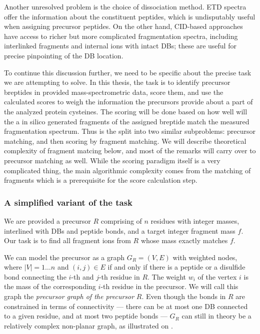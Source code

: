 Another unresolved problem is the choice of dissociation method. ETD spectra offer the information about the constituent peptides, which is undisputably useful when assigning precursor peptides. On the other hand, CID-based approaches have access to richer but more complicated fragmentation spectra, including interlinked fragments and internal ions with intact DBs; these are useful for precise pinpointing of the DB location.

To continue this discussion further, we need to be specific about the precise task we are attempting to solve. In this thesis, the task is to identify precursor breptides in provided mass-spectrometric data, score them, and use the calculated scores to weigh the information the precursors provide about a part of the analyzed protein cysteines. The scoring will be done based on how well will the a in silico generated fragments of the assigned breptide match the measured fragmentation spectrum. Thus is the split into two similar subproblems: precursor matching, and then scoring by fragment matching. We will describe theoretical complexity of fragment matcing below, and most of the remarks will carry over to precursor matching as well. While the scoring paradigm itself is a very complicated thing, the main algorithmic complexity comes from the matching of fragments which is a prerequisite for the score calculation step.

\subsubsection{A simplified variant of the task}

We are provided a precursor \(R\) comprising of \(n\) residues with integer masses, interlined with DBs and peptide bonds, and a target integer fragment mass \(f\). Our task is to find all fragment ions from \(R\) whose mass exactly matches \(f\).


We can model the precursor as a graph \(G_R = (V, E)\) with weighted nodes, where \(|V|  = 1\ldots n\) and \((i, j) \in E\) if and only if there is a peptide or a disulfide bond connecting  the \(i\)-th and \(j\)-th residue in \(R\). The weight \(w_i\) of the vertex \(i\) is the mass of the corresponding \(i\)-th residue in the precursor. We will call this graph the \emph{precursor graph of the precursor} \(R\). Even though the bonds in \(R\) are constrained in terms of connectivity --- there can be at most one DB connected to a given residue, and at most two peptide bonds --- \(G_R\) can still in theory be a relatively complex non-planar graph, as illustrated on .

